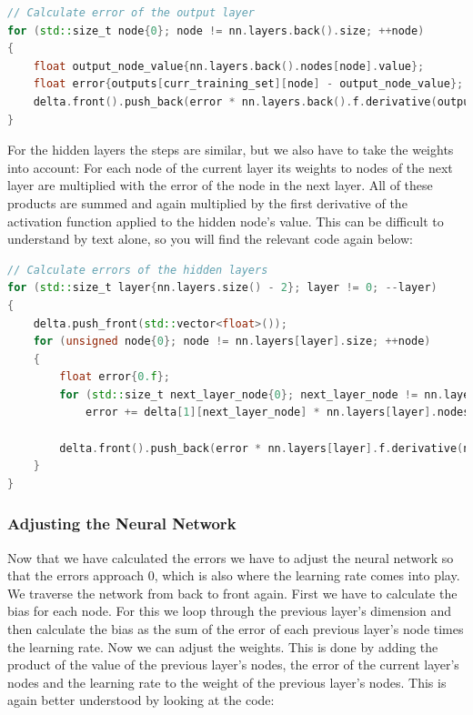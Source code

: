 \begin{lstlisting}[language=C++]
// Calculate error of the output layer
for (std::size_t node{0}; node != nn.layers.back().size; ++node)
{
	float output_node_value{nn.layers.back().nodes[node].value};
	float error{outputs[curr_training_set][node] - output_node_value};
	delta.front().push_back(error * nn.layers.back().f.derivative(output_node_value));
}
\end{lstlisting}

For the hidden layers the steps are similar, but we also have to take the weights into account: For each node of the current layer its weights to nodes of the next layer are multiplied with the error of the node in the next layer. All of these products are summed and again multiplied by the first derivative of the activation function applied to the hidden node's value. This can be difficult to understand by text alone, so you will find the relevant code again below:

\begin{lstlisting}[language=C++]
// Calculate errors of the hidden layers
for (std::size_t layer{nn.layers.size() - 2}; layer != 0; --layer)
{
	delta.push_front(std::vector<float>());
	for (unsigned node{0}; node != nn.layers[layer].size; ++node)
	{
		float error{0.f};
		for (std::size_t next_layer_node{0}; next_layer_node != nn.layers[layer + 1].dim; ++next_layer_node)
			error += delta[1][next_layer_node] * nn.layers[layer].nodes[node].weights[next_layer_node];

		delta.front().push_back(error * nn.layers[layer].f.derivative(nn.layers[layer].nodes[node].value));
	}
}
\end{lstlisting}

\subsubsection{Adjusting the Neural Network}
Now that we have calculated the errors we have to adjust the neural network so that the errors approach 0, which is also where the learning rate comes into play. We traverse the network from back to front again. First we have to calculate the bias for each node. For this we loop through the previous layer's dimension and then calculate the bias as the sum of the error of each previous layer's node times the learning rate. Now we can adjust the weights. This is done by adding the product of the value of the previous layer's nodes, the error of the current layer's nodes and the learning rate to the weight of the previous layer's nodes. This is again better understood by looking at the code: 

